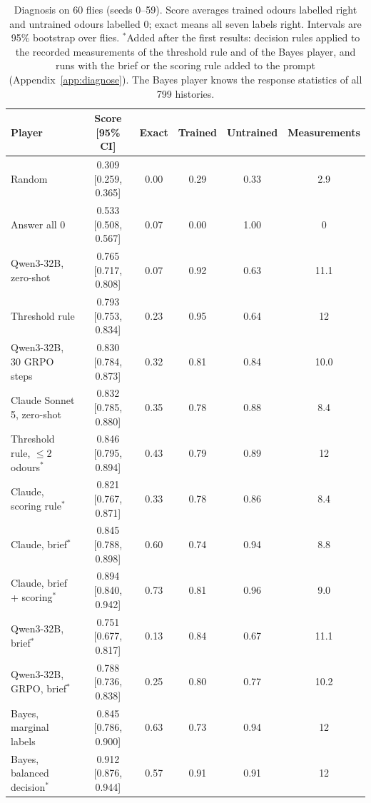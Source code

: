 \documentclass{article}
\begin{document}
\begin{table}[t]
\centering
\caption{Diagnosis on 60 flies (seeds 0--59). Score averages trained odours labelled right and untrained odours labelled $0$; exact means all seven labels right. Intervals are 95\% bootstrap over flies. $^\ast$Added after the first results: decision rules applied to the recorded measurements of the threshold rule and of the Bayes player, and runs with the brief or the scoring rule added to the prompt (Appendix~\ref{app:diagnose}). The Bayes player knows the response statistics of all 799 histories.}
\label{tab:diagnose}
\footnotesize
\begin{tabular}{lccccc}
\toprule
Player & Score [95\% CI] & Exact & Trained & Untrained & Measurements \\
\midrule
Random & 0.309 [0.259, 0.365] & 0.00 & 0.29 & 0.33 & 2.9 \\
Answer all $0$ & 0.533 [0.508, 0.567] & 0.07 & 0.00 & 1.00 & 0 \\
Qwen3-32B, zero-shot & 0.765 [0.717, 0.808] & 0.07 & 0.92 & 0.63 & 11.1 \\
Threshold rule & 0.793 [0.753, 0.834] & 0.23 & 0.95 & 0.64 & 12 \\
Qwen3-32B, 30 GRPO steps & 0.830 [0.784, 0.873] & 0.32 & 0.81 & 0.84 & 10.0 \\
Claude Sonnet 5, zero-shot & 0.832 [0.785, 0.880] & 0.35 & 0.78 & 0.88 & 8.4 \\
Threshold rule, $\le 2$ odours$^\ast$ & 0.846 [0.795, 0.894] & 0.43 & 0.79 & 0.89 & 12 \\
\midrule
Claude, scoring rule$^\ast$ & 0.821 [0.767, 0.871] & 0.33 & 0.78 & 0.86 & 8.4 \\
Claude, brief$^\ast$ & 0.845 [0.788, 0.898] & 0.60 & 0.74 & 0.94 & 8.8 \\
Claude, brief + scoring$^\ast$ & 0.894 [0.840, 0.942] & 0.73 & 0.81 & 0.96 & 9.0 \\
Qwen3-32B, brief$^\ast$ & 0.751 [0.677, 0.817] & 0.13 & 0.84 & 0.67 & 11.1 \\
Qwen3-32B, GRPO, brief$^\ast$ & 0.788 [0.736, 0.838] & 0.25 & 0.80 & 0.77 & 10.2 \\
\midrule
Bayes, marginal labels & 0.845 [0.786, 0.900] & 0.63 & 0.73 & 0.94 & 12 \\
Bayes, balanced decision$^\ast$ & 0.912 [0.876, 0.944] & 0.57 & 0.91 & 0.91 & 12 \\
\bottomrule
\end{tabular}
\end{table}
\end{document}

